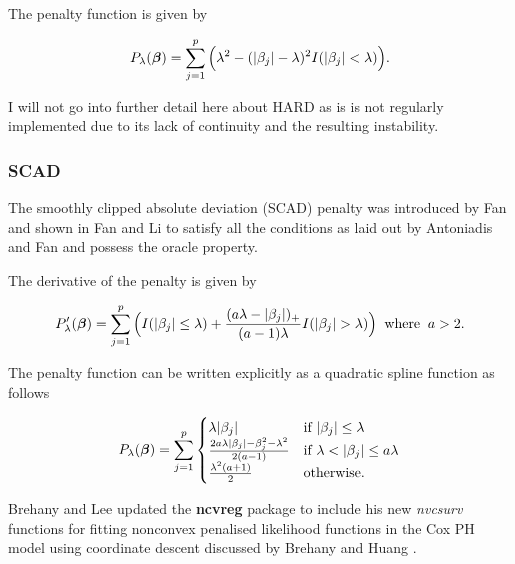 The penalty function is given by

\begin{equation}
    P_{\lambda}(\boldsymbol{\beta})=\sum_{j=1}^p\Big(\lambda^2 - (|\beta_j|-\lambda)^2I(|\beta_j|<\lambda)\Big).
\end{equation}

I will not go into further detail here about HARD as is is not regularly implemented due to its lack of continuity and the resulting instability.

\subsubsection{SCAD}

The smoothly clipped absolute deviation (SCAD) penalty was introduced by Fan  and shown in Fan and Li  to satisfy all the conditions as laid out by Antoniadis and Fan  and possess the oracle property.

The derivative of the penalty is given by

\begin{equation}
    P_\lambda'(\Beta) = \sum_{j=1}^p\Big(I(|\beta_j|\leq\lambda)+\frac{(a\lambda-|\beta_j|)_{+}}{(a-1)\lambda}I(|\beta_j|>\lambda)\Big)\;\;\textrm{where}\;\;a>2.
\end{equation}

The penalty function can be written explicitly as a quadratic spline function as follows

\begin{equation}
    P_\lambda(\Beta)=\sum_{j=1}^p
    \begin{cases}
        \lambda|\beta_j| &\textrm{if }|\beta_j|\leq\lambda\\
        \frac{2a\lambda|\beta_j|-\beta_j^2-\lambda^2}{2(a-1)} &\textrm{if }\lambda<|\beta_j|\leq a\lambda\\
        \frac{\lambda^2(a+1)}{2} &\textrm{otherwise}.
    \end{cases}
\end{equation}


Brehany and Lee  updated the \textbf{ncvreg} package to include his new \emph{nvcsurv} functions for fitting nonconvex penalised likelihood functions in the Cox PH model using coordinate descent discussed by Brehany and Huang .

